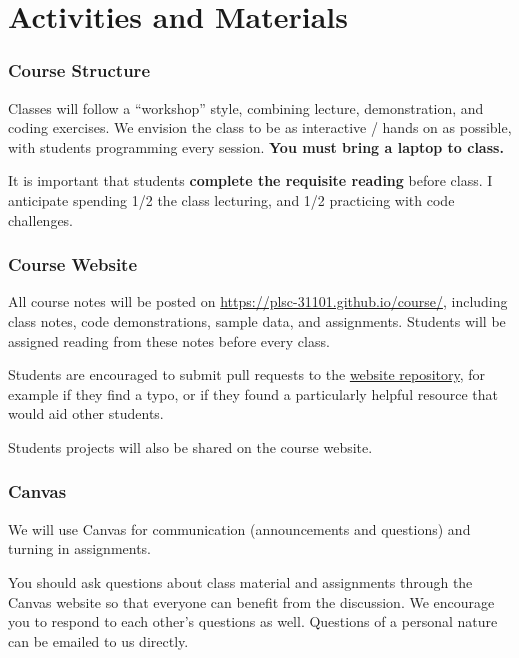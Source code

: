 \documentclass[]{book}
\begin{document}
\section{Activities and Materials}\label{activities-and-materials}

\subsubsection*{Course Structure}\label{course-structure}

Classes will follow a ``workshop'' style, combining lecture,
demonstration, and coding exercises. We envision the class to be as
interactive / hands on as possible, with students programming every
session. \textbf{You must bring a laptop to class.}

It is important that students \textbf{complete the requisite reading}
before class. I anticipate spending 1/2 the class lecturing, and 1/2
practicing with code challenges.

\subsubsection*{Course Website}\label{course-website}

All course notes will be posted on
\url{https://plsc-31101.github.io/course/}, including class notes, code
demonstrations, sample data, and assignments. Students will be assigned
reading from these notes before every class.

Students are encouraged to submit pull requests to the
\href{https://github.com/plsc-31101/course/}{website repository}, for
example if they find a typo, or if they found a particularly helpful
resource that would aid other students.

Students projects will also be shared on the course website.

\subsubsection*{Canvas}\label{canvas}

We will use Canvas for communication (announcements and questions) and
turning in assignments.

You should ask questions about class material and assignments through
the Canvas website so that everyone can benefit from the discussion. We
encourage you to respond to each other's questions as well. Questions of
a personal nature can be emailed to us directly.
\end{document}
